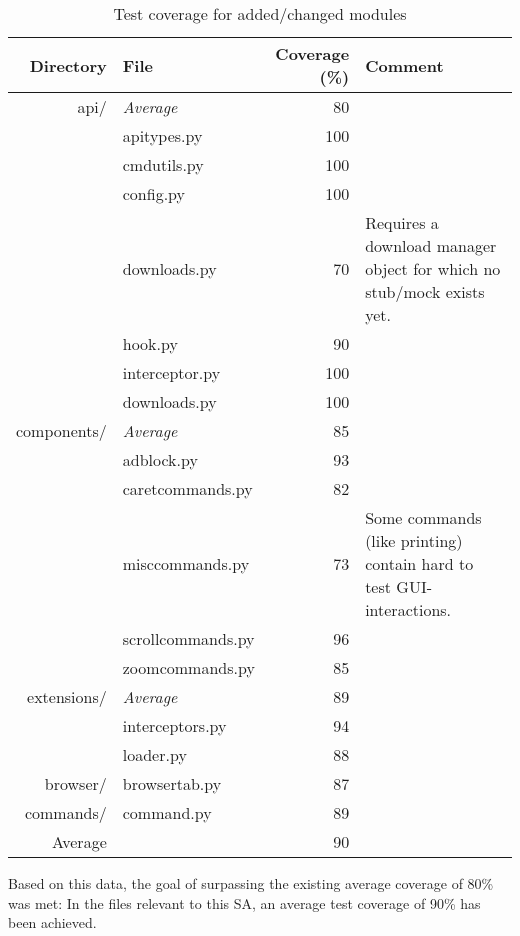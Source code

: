 \begingroup
\renewcommand{\arraystretch}{1}
\begin{table}[p]
  \centering
  \begin{tabulary}{\linewidth}{rlrL}
    \toprule
    Directory & File & Coverage (\%) & Comment \\
    \midrule
    api/ & \emph{Average} & 80 & \\
    & apitypes.py & 100 & \\
    & cmdutils.py & 100 & \\
    & config.py & 100 & \\
    & downloads.py & 70 & Requires a download manager object for which no
                          stub/mock exists yet. \\
    & hook.py & 90 & \\
    & interceptor.py & 100 & \\
    & downloads.py & 100 & \strut\vspace{2em} \\
    components/ & \emph{Average} & 85 & \\
    & adblock.py & 93 & \\
    & caretcommands.py & 82 & \\
    & misccommands.py & 73 & Some commands (like printing) contain
                             hard to test GUI-interactions. \\
    & scrollcommands.py & 96 & \\
    & zoomcommands.py & 85 & \strut\vspace{2em} \\
    extensions/ & \emph{Average} & 89 & \\
    & interceptors.py & 94 & \\
    & loader.py & 88 & \strut\vspace{2em} \\
    browser/ & browsertab.py & 87 & \strut\vspace{2em} \\
    commands/ & command.py & 89 & \\
    \midrule
    Average & & 90 & \\
    \bottomrule
  \end{tabulary}
  \caption{Test coverage for added/changed modules}
  \label{tab:coverage}
\end{table}
\endgroup

Based on this data, the goal of surpassing the existing average coverage of 80\%
was met: In the files relevant to this SA, an average test coverage of 90\% has
been achieved.

